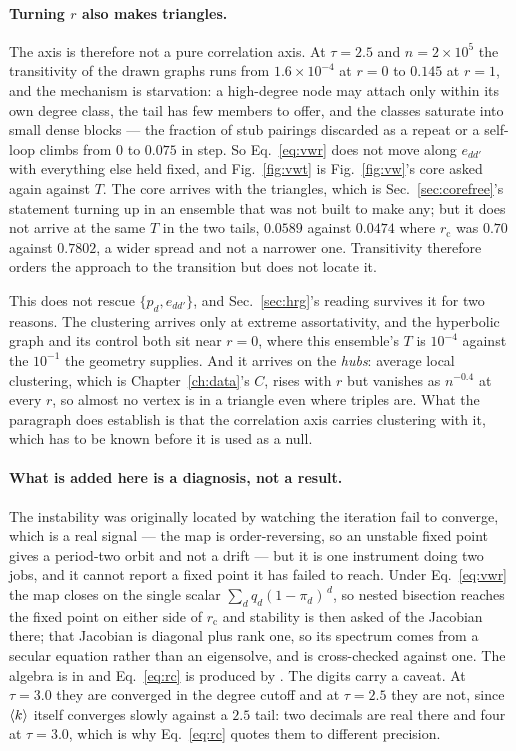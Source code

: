 \paragraph{Turning $r$ also makes triangles.} The axis is therefore not a
pure correlation axis. At $\tau=2.5$ and $n=2\times10^{5}$ the transitivity of
the drawn graphs runs from $1.6\times10^{-4}$ at $r=0$ to $0.145$ at $r=1$, and
the mechanism is starvation: a high-degree node may attach only within its own
degree class, the tail has few members to offer, and the classes saturate into
small dense blocks --- the fraction of stub pairings discarded as a repeat or a
self-loop climbs from $0$ to $0.075$ in step. So Eq.~\eqref{eq:vwr} does not
move along $e_{dd'}$ with everything else held fixed, and
Fig.~\ref{fig:vwt} is Fig.~\ref{fig:vw}'s core asked again against $T$. The
core arrives with the triangles, which is Sec.~\ref{sec:corefree}'s statement
turning up in an ensemble that was not built to make any; but it does not
arrive at the same $T$ in the two tails, $0.0589$ against $0.0474$ where
$r_{\mathrm{c}}$ was $0.70$ against $0.7802$, a wider spread and not a
narrower one. Transitivity therefore orders the approach to the transition but
does not locate it.

This does not rescue $\{p_{d},e_{dd'}\}$, and Sec.~\ref{sec:hrg}'s reading
survives it for two reasons. The clustering arrives only at extreme
assortativity, and the hyperbolic graph and its control both sit near $r=0$,
where this ensemble's $T$ is $10^{-4}$ against the $10^{-1}$ the geometry
supplies. And it arrives on the \emph{hubs}: average local clustering, which is
Chapter~\ref{ch:data}'s $C$, rises with $r$ but vanishes as $n^{-0.4}$ at every
$r$, so almost no vertex is in a triangle even where triples are. What the
paragraph does establish is that the correlation axis carries clustering with
it, which has to be known before it is used as a null.

\paragraph{What is added here is a diagnosis, not a result.} The instability
was originally located by watching the iteration fail to converge, which is a
real signal --- the map is order-reversing, so an unstable fixed point gives a
period-two orbit and not a drift --- but it is one instrument doing two jobs,
and it cannot report a fixed point it has failed to reach. Under
Eq.~\eqref{eq:vwr} the map closes on the single scalar
$\sum_{d}q_{d}(1-\pi_{d})^{\,d}$, so nested bisection reaches the fixed point on
either side of $r_{\mathrm{c}}$ and stability is then asked of the Jacobian
there; that Jacobian is diagonal plus rank one, so its spectrum comes from a
secular equation rather than an eigensolve, and is cross-checked against one.
The algebra is in  and
Eq.~\eqref{eq:rc} is produced by
.
The digits carry a caveat. At $\tau=3.0$ they are converged in the degree
cutoff and at $\tau=2.5$ they are not, since $\langle k \rangle$ itself converges slowly
against a $2.5$ tail: two decimals are real there and four at $\tau=3.0$, which
is why Eq.~\eqref{eq:rc} quotes them to different precision.

